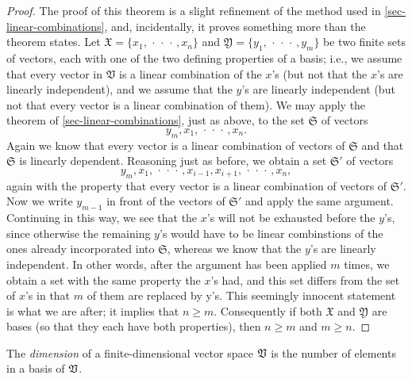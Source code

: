 \begin{proof}
    The proof of this theorem is a slight refinement of the method used in
    \cref{sec-linear-combinations}, and, incidentally, it proves something more
    than the theorem states. Let \(\mathfrak{X}= \{x_1, \,\cdot\,\cdot\,\cdot\,,
    x_n\}\) and \(\mathfrak{Y}= \{y_1, \,\cdot\,\cdot\,\cdot\,, y_m\}\) be two
    finite sets of vectors, each with one of the two defining properties of a
    basis; i.e., we assume that every vector in \(\mathfrak{V}\) is a linear
    combination of the \(x\)'s (but not that the \(x\)'s are linearly
    independent), and we assume that the \(y\)'s are linearly independent (but
    not that every vector is a linear combination of them). We may apply the
    theorem of \cref{sec-linear-combinations}, just as above, to the set
    \(\mathfrak{S}\) of vectors 
    \begin{equation*}
        y_m, x_1, \,\cdot\,\cdot\,\cdot\,, x_n.
    \end{equation*}
    Again we know that every vector is a linear combination of vectors of
    \(\mathfrak{S}\) and that \(\mathfrak{S}\) is linearly dependent. Reasoning just as
    before, we obtain a set \(\mathfrak{S}'\) of vectors
    \begin{equation*}
        y_m, x_1, \,\cdot\,\cdot\,\cdot\,, x_{i-1}, x_{i+1}, \,\cdot\,\cdot\,\cdot\,, x_n,
    \end{equation*}
    again with the property that every vector is a linear combination of vectors
    of \(\mathfrak{S}'\). Now we write \(y_{m-1}\) in front of the vectors of
    \(\mathfrak{S}'\) and apply the same argument. Continuing in this way, we
    see that the \(x\)'s will not be exhausted before the \(y\)'s, since
    otherwise the remaining \(y\)'s would have to be linear combinstions of the
    ones already incorporated into \(\mathfrak{S}\), whereas we know that the
    \(y\)'s are linearly independent. In other words, after the argument has
    been applied \(m\) times, we obtain a set with the same property the \(x\)'s
    had, and this set differs from the set of \(x\)'s in that \(m\) of them are
    replaced by y's. This seemingly innocent statement is what we are after; it
    implies that \(n \geq m\). Consequently if both \(\mathfrak{X}\) and
    \(\mathfrak{Y}\) are bases (so that they each have both properties), then
    \(n \geq m\) and \(m \geq n\).
\end{proof}

\begin{definition}
    The \emph{dimension} of a finite-dimensional vector space \(\mathfrak{V}\) is the number of elements in a basis of \(\mathfrak{V}\).
\end{definition}

